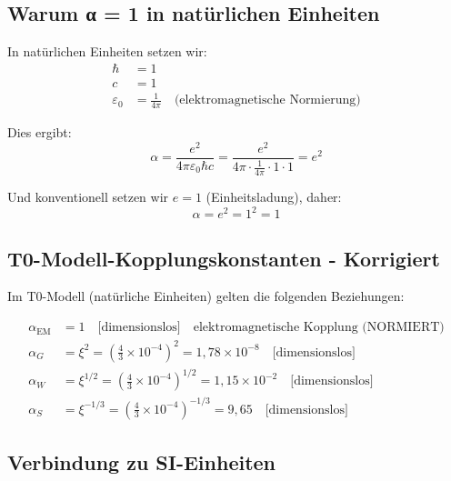\documentclass[12pt,a4paper]{report}
\begin{document}
	\subsection{Warum α = 1 in natürlichen Einheiten}
	\label{subsec:why_alpha_equals_one}
	
	In natürlichen Einheiten setzen wir:
	\begin{align}
		\hbar &= 1 \\
		c &= 1 \\
		\varepsilon_0 &= \frac{1}{4\pi} \quad \text{(elektromagnetische Normierung)}
	\end{align}
	
	Dies ergibt:
	\begin{equation}
		\alpha = \frac{e^2}{4\pi\varepsilon_0\hbar c} = \frac{e^2}{4\pi \cdot \frac{1}{4\pi} \cdot 1 \cdot 1} = e^2
	\end{equation}
	
	Und konventionell setzen wir $e = 1$ (Einheitsladung), daher:
	\begin{equation}
		\boxed{\alpha = e^2 = 1^2 = 1}
	\end{equation}
	
	\subsection{T0-Modell-Kopplungskonstanten - Korrigiert}
	\label{subsec:t0_coupling_corrected}
	
	Im T0-Modell (natürliche Einheiten) gelten die folgenden Beziehungen:
	
	\begin{align}
		\alpha_{\text{EM}} &= 1 \quad \text{[dimensionslos]} \quad \text{elektromagnetische Kopplung (NORMIERT)} \\
		\alpha_G &= \xi^2 = \left(\frac{4}{3} \times 10^{-4}\right)^2 = 1,78 \times 10^{-8} \quad \text{[dimensionslos]} \\
		\alpha_W &= \xi^{1/2} = \left(\frac{4}{3} \times 10^{-4}\right)^{1/2} = 1,15 \times 10^{-2} \quad \text{[dimensionslos]} \\
		\alpha_S &= \xi^{-1/3} = \left(\frac{4}{3} \times 10^{-4}\right)^{-1/3} = 9,65 \quad \text{[dimensionslos]}
	\end{align}
	
	\subsection{Verbindung zu SI-Einheiten}
	\label{subsec:connection_to_si}
	
\end{document}
